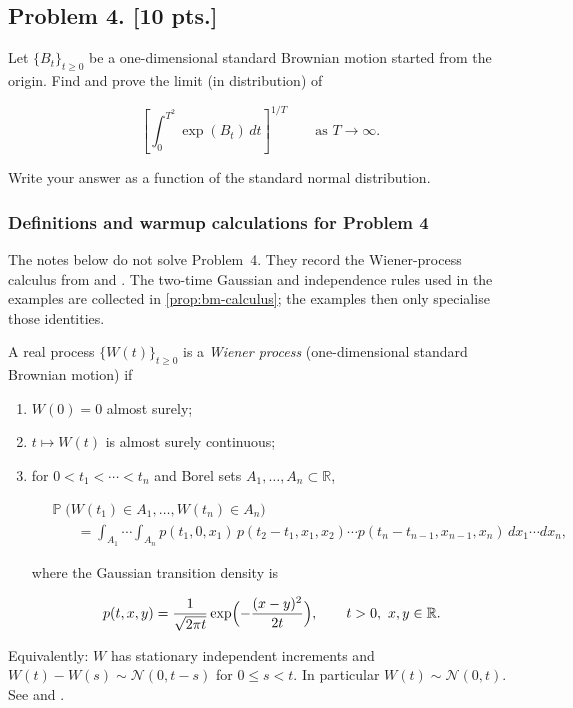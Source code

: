 \documentclass[11pt,a4paper]{article}
\DeclareMathOperator{\Pbb}{\mathbb{P}}
\begin{document}
\subsection{Problem 4. [10 pts.]}
Let \( \{B_t\}_{t \ge 0} \) be a one-dimensional standard Brownian motion started from the origin. Find and prove the limit (in distribution) of

\[
\left[ \int_0^{T^2} \exp(B_t)\, dt \right]^{1/T} \qquad \text{as } T \to \infty.
\]

Write your answer as a function of the standard normal distribution.

\setcounter{section}{4}
\setcounter{definition}{0}

\subsubsection{Definitions and warmup calculations for Problem 4}

The notes below do not solve Problem~4. They record the Wiener-process calculus from \citep{brzezniak1999} and \citep[Chapter~8]{durrett2010}. The two-time Gaussian and independence rules used in the examples are collected in \cref{prop:bm-calculus}; the examples then only specialise those identities.

\begin{definition}
\label{def:brownian-motion}
A real process \(\{W(t)\}_{t\ge 0}\) is a \emph{Wiener process} (one-dimensional standard Brownian motion) if
\begin{enumerate}[label=\textup{(\roman*)}]
    \item
    \(W(0)=0\) almost surely;
    \item
    \(t\mapsto W(t)\) is almost surely continuous;
    \item
    for \(0<t_1<\cdots<t_n\) and Borel sets \(A_1,\dots,A_n\subset\mathbb{R}\),

\[
\begin{aligned}
&\Pbb\bigl(W(t_1)\in A_1,\dots,W(t_n)\in A_n\bigr)\\
&\qquad=
\int_{A_1}\cdots\int_{A_n}
p(t_1,0,x_1)\,p(t_2-t_1,x_1,x_2)\cdots p(t_n-t_{n-1},x_{n-1},x_n)\,dx_1\cdots dx_n,
\end{aligned}
\]

where the Gaussian transition density is

\[
p(t,x,y)
=
\frac{1}{\sqrt{2\pi t}}
\exp\Bigl(-\frac{(x-y)^2}{2t}\Bigr),
\qquad
t>0,\ x,y\in\mathbb{R}.
\]
\end{enumerate}
Equivalently: \(W\) has stationary independent increments and \(W(t)-W(s)\sim\mathcal{N}(0,t-s)\) for \(0\le s<t\). In particular \(W(t)\sim\mathcal{N}(0,t)\). See \citep[Definition~6.9, Proposition~6.2, Theorem~6.3]{brzezniak1999} and \citep[Chapter~8]{durrett2010}.
\end{definition}
\end{document}
